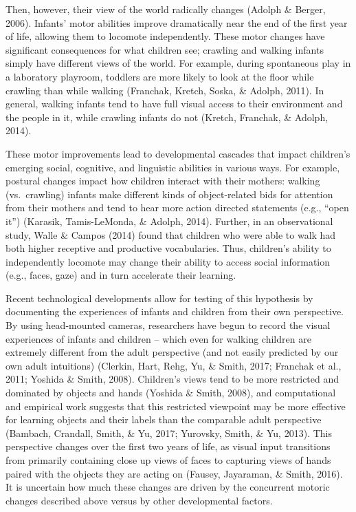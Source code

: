 \documentclass[10pt, letterpaper]{article}
\begin{document}
Then, however, their view of the world radically changes (Adolph \&
Berger, 2006). Infants' motor abilities improve dramatically near the
end of the first year of life, allowing them to locomote independently.
These motor changes have significant consequences for what children see;
crawling and walking infants simply have different views of the world.
For example, during spontaneous play in a laboratory playroom, toddlers
are more likely to look at the floor while crawling than while walking
(Franchak, Kretch, Soska, \& Adolph, 2011). In general, walking infants
tend to have full visual access to their environment and the people in
it, while crawling infants do not (Kretch, Franchak, \& Adolph, 2014).

These motor improvements lead to developmental cascades that impact
children's emerging social, cognitive, and linguistic abilities in
various ways. For example, postural changes impact how children interact
with their mothers: walking (vs.~crawling) infants make different kinds
of object-related bids for attention from their mothers and tend to hear
more action directed statements (e.g., ``open it'') (Karasik,
Tamis-LeMonda, \& Adolph, 2014). Further, in an observational study,
Walle \& Campos (2014) found that children who were able to walk had
both higher receptive and productive vocabularies. Thus, children's
ability to independently locomote may change their ability to access
social information (e.g., faces, gaze) and in turn accelerate their
learning.

Recent technological developments allow for testing of this hypothesis
by documenting the experiences of infants and children from their own
perspective. By using head-mounted cameras, researchers have begun to
record the visual experiences of infants and children -- which even for
walking children are extremely different from the adult perspective (and
not easily predicted by our own adult intuitions) (Clerkin, Hart, Rehg,
Yu, \& Smith, 2017; Franchak et al., 2011; Yoshida \& Smith, 2008).
Children's views tend to be more restricted and dominated by objects and
hands (Yoshida \& Smith, 2008), and computational and empirical work
suggests that this restricted viewpoint may be more effective for
learning objects and their labels than the comparable adult perspective
(Bambach, Crandall, Smith, \& Yu, 2017; Yurovsky, Smith, \& Yu, 2013).
This perspective changes over the first two years of life, as visual
input transitions from primarily containing close up views of faces to
capturing views of hands paired with the objects they are acting on
(Fausey, Jayaraman, \& Smith, 2016). It is uncertain how much these
changes are driven by the concurrent motoric changes described above
versus by other developmental factors.
\end{document}
